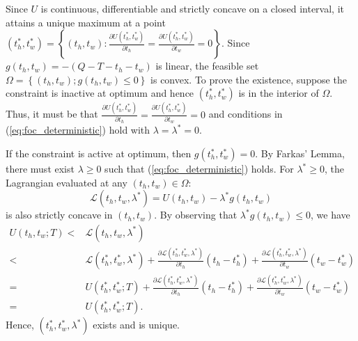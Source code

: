 \documentclass[12pt,a4paper,british]{article}
\makeatletter
\theoremstyle{definition}
\theoremstyle{plain}
\newenvironment{proof}[1][\proofname]{\par
    \normalfont\topsep6\p@\@plus6\p@\relax
    \trivlist
    \itemindent\parindent
    \item[\hskip\labelsep
          \scshape
      #1]\ignorespaces
  }{%
    \endtrivlist\@endpefalse
  }
\providecommand{\proofname}{Proof}
\theoremstyle{plain}
\makeatother
\begin{document}
\begin{proof}
Since $U$ is continuous, differentiable and strictly concave on a closed interval, it attains a unique maximum at a point $\left(t_{h}^{\ast},t_{w}^{\ast}\right)=\left\{ \left(t_{h},t_{w}\right):\frac{\partial U\left(t_{h}^{\ast},t_{w}^{\ast}\right)}{\partial t_{h}}=\frac{\partial U\left(t_{h}^{\ast},t_{w}^{\ast}\right)}{\partial t_{w}}=0\right\} $. Since $g\left(t_{h},t_{w}\right)=-\left(Q-T-t_{h}-t_{w}\right)$ is linear, the feasible set $\Omega=\left\{ \left(t_{h},t_{w}\right);g\left(t_{h},t_{w}\right)\leq0\right\} $ is convex. To prove the existence, suppose the constraint is inactive
at optimum and hence $\left(t_{h}^{\ast},t_{w}^{\ast}\right)$ is in the interior of $\Omega$. Thus, it must be that $\frac{\partial U\left(t_{h}^{\ast},t_{w}^{\ast}\right)}{\partial t_{h}}=\frac{\partial U\left(t_{h}^{\ast},t_{w}^{\ast}\right)}{\partial t_{w}}=0$
and conditions in (\ref{eq:foc_deterministic}) hold with $\lambda=\lambda^{\ast}=0$.

If the constraint is active at optimum, then $g\left(t_{h}^{\ast},t_{w}^{\ast}\right)=0$. By Farkas' Lemma, there must exist $\lambda\geq0$ such that (\ref{eq:foc_deterministic}) holds. For $\lambda^{\ast}\geq0$, the Lagrangian evaluated at any $\left(t_{h},t_{w}\right)\in\Omega$: 
\begin{equation*}
\mathcal{L}\left(t_{h},t_{w},\lambda^{\ast}\right)=U\left(t_{h},t_{w}\right)-\lambda^{\ast}g\left(t_{h},t_{w}\right)
\end{equation*}
is also strictly concave in $\left(t_{h},t_{w}\right)$. By observing that $\lambda^{\ast}g\left(t_{h},t_{w}\right)\leq0$, we have
\begin{align*}
U\left(t_{h},t_{w};T\right)< & \mathcal{L}\left(t_{h},t_{w},\lambda^{\ast}\right)\\
< & \mathcal{L}\left(t_{h}^{\ast},t_{w}^{\ast},\lambda^{\ast}\right)+\frac{\partial\mathcal{L}\left(t_{h}^{\ast},t_{w}^{\ast},\lambda^{\ast}\right)}{\partial t_{h}}\left(t_{h}-t_{h}^{\ast}\right)+\frac{\partial\mathcal{L}\left(t_{h}^{\ast},t_{w}^{\ast},\lambda^{\ast}\right)}{\partial t_{w}}\left(t_{w}-t_{w}^{\ast}\right)\\
= & U\left(t_{h}^{\ast},t_{w}^{\ast};T\right)+\frac{\partial\mathcal{L}\left(t_{h}^{\ast},t_{w}^{\ast},\lambda^{\ast}\right)}{\partial t_{h}}\left(t_{h}-t_{h}^{\ast}\right)+\frac{\partial\mathcal{L}\left(t_{h}^{\ast},t_{w}^{\ast},\lambda^{\ast}\right)}{\partial t_{w}}\left(t_{w}-t_{w}^{\ast}\right)\\
= & U\left(t_{h}^{\ast},t_{w}^{\ast};T\right).
\end{align*}
Hence, $\left(t_{h}^{\ast},t_{w}^{\ast},\lambda^{\ast}\right)$ exists and is unique.
\end{proof}
\end{document}
